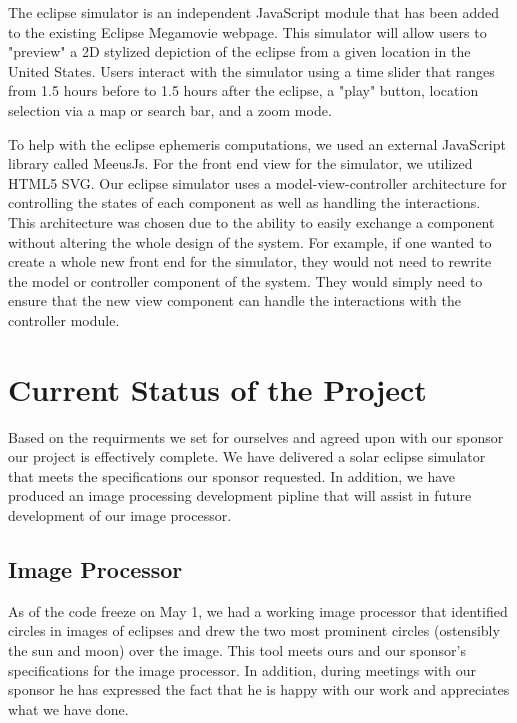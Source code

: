 \documentclass[10pt, onecolumn, draftclsnofoot, letterpaper, compsoc]{IEEEtran}
\begin{document}
The eclipse simulator is an independent JavaScript module that has been
added to the existing Eclipse Megamovie webpage. This simulator will allow
users to "preview" a 2D stylized depiction of the eclipse from a given location
in the United States. Users interact with the simulator using a time slider
that ranges from 1.5 hours before to 1.5 hours after the eclipse, a "play" button,
location selection via a map or search bar, and a zoom mode.

To help with the eclipse ephemeris computations, we used an external
JavaScript library called MeeusJs. For the front end view for the simulator,
we utilized HTML5 SVG. Our eclipse simulator uses a model-view-controller 
architecture for controlling the states of each component as well as handling
the interactions. This architecture was chosen due to the ability to easily
exchange a component without altering the whole design of the system. For
example, if one wanted to create a whole new front end for the simulator,
they would not need to rewrite the model or controller component of the system.
They would simply need to ensure that the new view component can handle the
interactions with the controller module. \\


\section{Current Status of the Project}

Based on the requirments we set for ourselves and agreed upon with our sponsor
our project is effectively complete. We have delivered a solar eclipse simulator
that meets the specifications our sponsor requested. In addition, we have
produced an image processing development pipline that will assist in future
development of our image processor. \\

\subsection{Image Processor}

As of the code freeze on May 1, we had a working image processor that identified
circles in images of eclipses and drew the two most prominent circles
(ostensibly the sun and moon) over the image. This tool meets ours and our
sponsor's specifications for the image processor. In addition, during meetings
with our sponsor he has expressed the fact that he is happy with our work and
appreciates what we have done. \\
\end{document}
